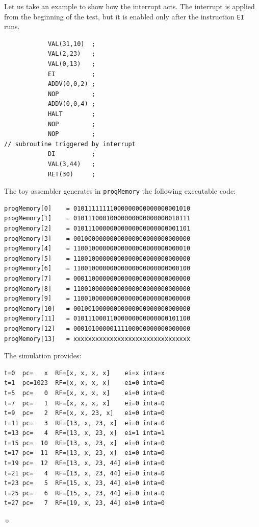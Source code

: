 \begin{exemplu}
Let us take an example to show how the interrupt acts. The interrupt is applied from the beginning of the test, but it is enabled only after the instruction {\tt EI} runs.

{\small
\begin{verbatim}
            VAL(31,10)  ;
            VAL(2,23)   ;
            VAL(0,13)   ;
            EI          ;
            ADDV(0,0,2) ;
            NOP         ;
            ADDV(0,0,4) ;
            HALT        ;
            NOP         ;
            NOP         ;
// subroutine triggered by interrupt
            DI          ;
            VAL(3,44)   ;
            RET(30)     ;
\end{verbatim}
}

The toy assembler generates in {\tt progMemory} the following executable code:

{\small
\begin{verbatim}
progMemory[0]    = 01011111111000000000000000001010
progMemory[1]    = 01011100010000000000000000010111
progMemory[2]    = 01011100000000000000000000001101
progMemory[3]    = 00100000000000000000000000000000
progMemory[4]    = 11001000000000000000000000000010
progMemory[5]    = 11001000000000000000000000000000
progMemory[6]    = 11001000000000000000000000000100
progMemory[7]    = 00011000000000000000000000000000
progMemory[8]    = 11001000000000000000000000000000
progMemory[9]    = 11001000000000000000000000000000
progMemory[10] 	 = 00100100000000000000000000000000
progMemory[11] 	 = 01011100011000000000000000101100
progMemory[12] 	 = 00010100000111100000000000000000
progMemory[13] 	 = xxxxxxxxxxxxxxxxxxxxxxxxxxxxxxxx
\end{verbatim}
}
The simulation provides:
{\small
\begin{verbatim}
t=0  pc=   x  RF=[x, x, x, x]    ei=x inta=x
t=1  pc=1023  RF=[x, x, x, x]    ei=0 inta=0
t=5  pc=   0  RF=[x, x, x, x]    ei=0 inta=0
t=7  pc=   1  RF=[x, x, x, x]    ei=0 inta=0
t=9  pc=   2  RF=[x, x, 23, x]   ei=0 inta=0
t=11 pc=   3  RF=[13, x, 23, x]  ei=0 inta=0
t=13 pc=   4  RF=[13, x, 23, x]  ei=1 inta=1
t=15 pc=  10  RF=[13, x, 23, x]  ei=0 inta=0
t=17 pc=  11  RF=[13, x, 23, x]  ei=0 inta=0
t=19 pc=  12  RF=[13, x, 23, 44] ei=0 inta=0
t=21 pc=   4  RF=[13, x, 23, 44] ei=0 inta=0
t=23 pc=   5  RF=[15, x, 23, 44] ei=0 inta=0
t=25 pc=   6  RF=[15, x, 23, 44] ei=0 inta=0
t=27 pc=   7  RF=[19, x, 23, 44] ei=0 inta=0
\end{verbatim}
}

$\diamond$
\end{exemplu}

